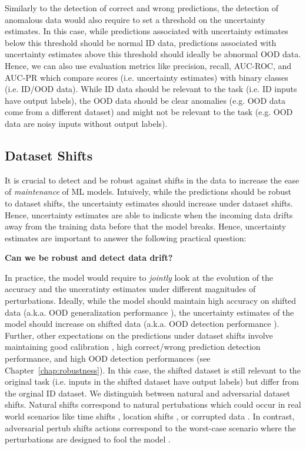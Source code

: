 Similarly to the detection of correct and wrong predictions, the detection of anomalous data would also require to set a threshold on the uncertainty estimates. In this case, while predictions associated with uncertainty estimates below this threshold should be normal ID data, predictions associated with uncertainty estimates above this threshold should ideally be abnormal OOD data. Hence, we can also use evaluation metrics like precision, recall, AUC-ROC, and AUC-PR which compare scores (i.e. uncertainty estimates) with binary classes (i.e. ID/OOD data). While ID data should be relevant to the task (i.e. ID inputs have output labels), the OOD data should be clear anomalies (e.g. OOD data come from a different dataset) and might not be relevant to the task (e.g. OOD data are noisy inputs without output labels).

\subsection{Dataset Shifts}

It is crucial to detect and be robust against shifts in the data to increase the ease of \emph{maintenance} of ML models. Intuively, while the predictions should be robust to dataset shifts, the uncertainty estimates should increase under dataset shifts. Hence, uncertainty estimates are able to indicate when the incoming data drifts away from the training data before that the model breaks. Hence, uncertainty estimates are important to answer the following practical question:

\begin{center}
    \textbf{Can we be robust and detect data drift?}
\end{center}

In practice, the model would require to \emph{jointly} look at the evolution of the accuracy and the unceratinty estimates under different magnitudes of perturbations. Ideally, while the model should maintain high accuracy on shifted data (a.k.a. OOD generalization performance ), the uncertainty estimates of the model should increase on shifted data (a.k.a. OOD detection performance ). Further, other expectations on the predictions under dataset shifts involve maintaining good calibration \cite{dataset-shift}, high correct/wrong prediction detection performance, and high OOD detection performances (see Chapter~\ref{chap:robustness}). In this case, the shifted dataset is still relevant to the original task (i.e. inputs in the shifted dataset have output labels) but differ from the orginal ID dataset. We distinguish between natural and adversarial dataset shifts. Natural shifts correspond to natural pertubations which could occur in real world scenarios like time shifts , location shifts , or corrupted data . In contrast, adversarial pertub shifts actions correspond to the worst-case scenario where the perturbations are designed to fool the model .

